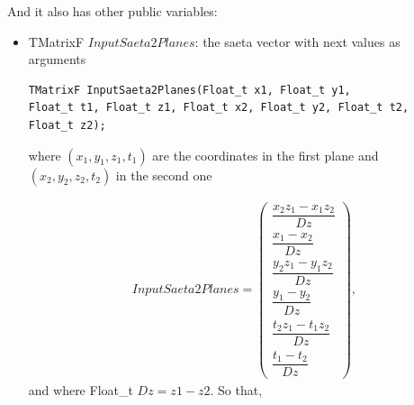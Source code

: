 \documentclass[a4paper]{book}
\let\vec\mathbf  %
\begin{document}
And it also has other public variables:

\begin{itemize}
	\item TMatrixF $InputSaeta2Planes$: the saeta vector with next values as arguments
	
	\begin{lstlisting}
TMatrixF InputSaeta2Planes(Float_t x1, Float_t y1, 
Float_t t1, Float_t z1, Float_t x2, Float_t y2, Float_t t2, 
Float_t z2);
	\end{lstlisting}
	
	where $(x_1, y_1, z_1, t_1)$ are the coordinates in the first plane and $(x_2, y_2, z_2, t_2)$ in the second one
	
	
	\begin{align*}
	InputSaeta2Planes = \left(
	\begin{array}{c}
	 \dfrac{x_2 z_1-x_1 z_2}{Dz}\\
	 \dfrac{x_1-x_2}{Dz} \\
	 \dfrac{y_2 z_1-y_1 z_2}{Dz} \\
	 \dfrac{y_1-y_2}{Dz} \\
	 \dfrac{t_2 z_1-t_1 z_2}{Dz} \\
	 \dfrac{t_1-t_2}{Dz}
	\end{array} \right),
	\end{align*}
	and where Float\_t $Dz = z1 - z2$. So that,
	

\end{itemize}
\end{document}
